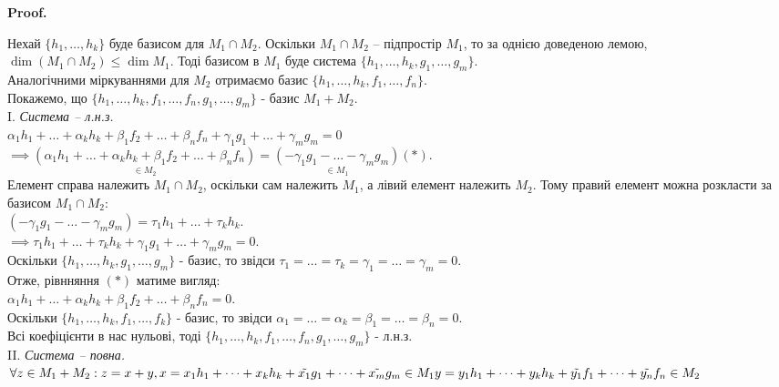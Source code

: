 \documentclass[a4paper, 10pt]{article}
\makeatletter
\theoremstyle{theoremdd}
\renewenvironment{proof}[1][Proof.\\]{\par
\pushQED{\hfill \qed}%
\normalfont \topsep6\p@\@plus6\p@\relax
\trivlist
\item\relax
{\bfseries
#1\@addpunct{.}}\hspace\labelsep\ignorespaces
}{%
\popQED\endtrivlist\@endpefalse
}
\makeatother
\begin{document}
	\begin{proof}
	Нехай $\{h_1, \dots, h_k\}$ буде базисом для $M_1 \cap M_2$. Оскільки $M_1 \cap M_2$ -- підпростір $M_1$, то за однією доведеною лемою, $\dim (M_1 \cap M_2) \leq \dim M_1$. Тоді базисом в $M_1$ буде система $\{h_1, \dots, h_k, g_1, \dots, g_m\}$.\\
	Аналогічними міркуваннями для $M_2$ отримаємо базис $\{h_1, \dots, h_k, f_1, \dots, f_n\}$.\\
	Покажемо, що $\{h_1, \dots, h_k, f_1, \dots, f_n, g_1, \dots, g_m\}$ - базис $M_1 + M_2$.
	\bigskip \\
	I. \textit{Система -- л.н.з.}\\
	$\alpha_1 h_1 + \dots + \alpha_k h_k + \beta_1 f_2 + \dots + \beta_n f_n + \gamma_1 g_1 + \dots + \gamma_m g_m = 0$\\
	$\implies \underset{\in M_2}{(\alpha_1 h_1 + \dots + \alpha_k h_k + \beta_1 f_2 + \dots + \beta_n f_n)} = \underset{\in M_1}{(-\gamma_1 g_1 - \dots - \gamma_m g_m)} (*)$.\\
	Елемент справа належить $M_1 \cap M_2$, оскільки сам належить $M_1$, а лівий елемент належить $M_2$. Тому правий елемент можна розкласти за базисом $M_1 \cap M_2$:\\
	$(-\gamma_1 g_1 - \dots - \gamma_m g_m) = \tau_1 h_1 + \dots + \tau_k h_k$.\\
	$\implies \tau_1 h_1 + \dots + \tau_k h_k +\gamma_1 g_1 + \dots + \gamma_m g_m = 0$.\\
	Оскільки $\{h_1, \dots, h_k, g_1, \dots, g_m\}$ - базис, то звідси $\tau_1 = \dots = \tau_k = \gamma_1 = \dots = \gamma_m = 0$.\\
	Отже, рівнняння $(*)$ матиме вигляд:\\
	$\alpha_1 h_1 + \dots + \alpha_k h_k + \beta_1 f_2 + \dots + \beta_n f_n = 0$.\\
	Оскільки $\{h_1, \dots, h_k, f_1, \dots, f_k\}$ - базис, то звідси $\alpha_1 = \dots = \alpha_k = \beta_1 = \dots = \beta_n = 0$.\\
	Всі коефіцієнти в нас нульові, тоді $\{h_1, \dots, h_k, f_1, \dots, f_n, g_1, \dots, g_m\}$ - л.н.з.
	\bigskip \\
	II. \textit{Система -- повна.}\\
	$\forall z \in M_1 + M_2: z = x + y, \\x = x_1 h_1 + \dots + x_k h_k + \tilde{x_1}g_1 + \dots + \tilde{x_m}g_m \in M_1 \\ y = y_1 h_1 + \dots + y_k h_k + \tilde{y_1}f_1 + \dots + \tilde{y_n}f_n \in M_2$\\

\end{proof}
\end{document}
